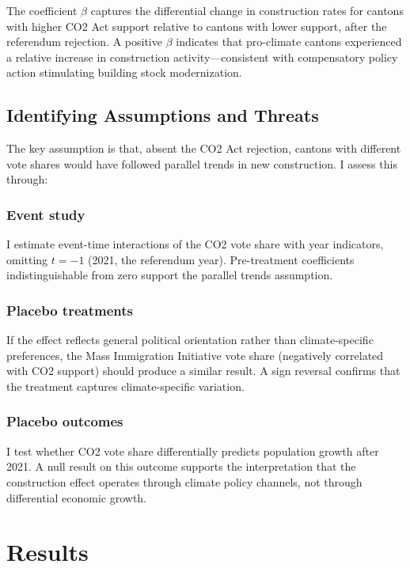 \documentclass[12pt]{article}
\begin{document}
The coefficient $\beta$ captures the differential change in construction rates for cantons with higher CO2 Act support relative to cantons with lower support, after the referendum rejection. A positive $\beta$ indicates that pro-climate cantons experienced a relative increase in construction activity---consistent with compensatory policy action stimulating building stock modernization.

\subsection{Identifying Assumptions and Threats}

The key assumption is that, absent the CO2 Act rejection, cantons with different vote shares would have followed parallel trends in new construction. I assess this through:

\subsubsection*{Event study} I estimate event-time interactions of the CO2 vote share with year indicators, omitting $t = -1$ (2021, the referendum year). Pre-treatment coefficients indistinguishable from zero support the parallel trends assumption.

\subsubsection*{Placebo treatments} If the effect reflects general political orientation rather than climate-specific preferences, the Mass Immigration Initiative vote share (negatively correlated with CO2 support) should produce a similar result. A sign reversal confirms that the treatment captures climate-specific variation.

\subsubsection*{Placebo outcomes} I test whether CO2 vote share differentially predicts population growth after 2021. A null result on this outcome supports the interpretation that the construction effect operates through climate policy channels, not through differential economic growth.


\section{Results}
\label{sec:results}
\end{document}
